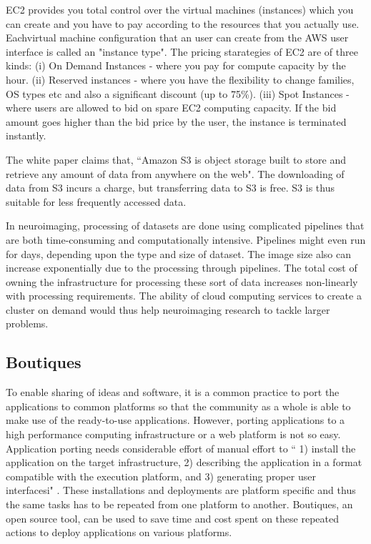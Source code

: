 EC2 provides you total control over the virtual machines (instances) which you can create and you have to pay according to the resources that you actually use. Eachvirtual machine configuration that an user can create from the AWS user interface is called an "instance type". The pricing starategies of EC2 are of three kinds: (i) On Demand Instances - where you pay for compute capacity by the hour. (ii) Reserved instances - where you have the flexibility to change families, OS types etc and also a significant discount (up to 75\%). (iii) Spot Instances - where users are allowed to bid on spare EC2 computing capacity. If the bid amount goes higher than the bid price by the user, the instance is terminated instantly.

The white paper \cite{Amazon-Web-Services} claims that, ``Amazon S3 is object storage built to store and retrieve any amount of data from anywhere on the web". The downloading of data from S3 incurs a charge, but transferring data to S3 is free. S3 is thus suitable for less frequently accessed data.

In neuroimaging, processing of datasets are done using complicated pipelines that are both time-consuming and computationally intensive. Pipelines might even run for days, depending upon the type and size of dataset. The image size also can increase exponentially due to the processing through pipelines. The total cost of owning the infrastructure for processing these sort of data increases non-linearly with processing requirements. The ability of cloud computing services to create a cluster on demand would thus help neuroimaging research to tackle larger problems.

\subsection{Boutiques}
To enable sharing of ideas and software, it is a common practice to port the applications to common platforms so that the community as a whole is able to make use of the ready-to-use applications. However, porting applications to a high performance computing infrastructure or a web platform is not so easy. Application porting needs considerable effort of manual effort to `` 1) install the application on the target infrastructure, 2) describing the application in a format compatible with the execution platform, and 3) generating proper user interfacesi" \cite{boutiques}. These installations and deployments are platform specific and thus the same tasks has to be repeated from one platform to another. Boutiques, an open source tool, can be used to save time and cost spent on these repeated actions to deploy applications on various platforms.

